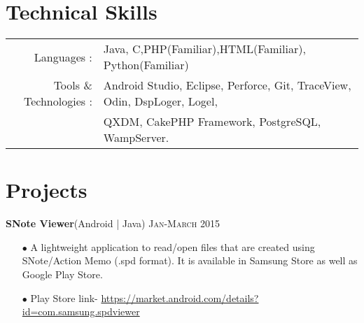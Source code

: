 \documentclass[letterpaper,11pt]{article}
\begin{document}

\section{Technical Skills}

\begin{tabular}{rl}
Languages : & Java, C,PHP(Familiar),HTML(Familiar), Python(Familiar) \\
Tools \& Technologies : & Android Studio, Eclipse, Perforce, Git, TraceView, Odin, DspLoger, Logel,\\
& QXDM, CakePHP Framework, PostgreSQL, WampServer.\\
\end{tabular}




\section{Projects}



\normalsize{\textbf {SNote Viewer}(Android | Java) } \hfill{\textsc{Jan-March 2015}}
{
\begin{itemize}\setlength{\itemsep}{-1pt}
        \item [$\bullet$]A lightweight application to read/open files that are created using SNote/Action Memo (.spd format). It is available in Samsung Store as well as Google Play Store.
        \item[$\bullet$] Play Store link-  \href{https://market.android.com/details?id=com.samsung.spdviewer}{https://market.android.com/details?id=com.samsung.spdviewer}\\[-3mm]
 \end{itemize}
}
\end{document}
